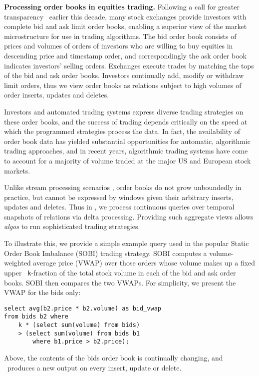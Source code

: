 \medskip


\textbf{Processing order books in equities trading.}  Following a call for
greater transparency~\cite{sec-orderbook:00} earlier this decade, many stock
exchanges provide investors with complete bid and ask limit order books,
enabling a superior view of the market microstructure for use in trading
algorithms. The bid order book consists of prices and volumes of orders of
investors who are willing to buy equities in descending price and timestamp
order, and correspondingly the ask order book indicates investors' selling
orders. Exchanges execute trades by matching the tops of the bid and ask order
books. Investors continually add, modify or withdraw limit orders, thus we view
order books as relations subject to high volumes of order inserts, updates and
deletes.

Investors and automated trading systems express diverse trading strategies on
these order books, and the success of trading depends critically on the speed at
which the programmed strategies process the data.  In fact, the availability of
order book data has yielded substantial opportunities for automatic, algorithmic
trading approaches, and in recent years, algorithmic trading systems have come
to account for a majority of volume traded at the major US and European stock
markets.

Unlike stream processing scenarios \cite{abadi-vldbj:03,motwani-cidr:03}, order
books do not grow unboundedly in practice, but cannot be expressed by windows
given their arbitrary inserts, updates and deletes. Thus in \compiler, we
process continuous queries over temporal snapshots of relations via delta
processing.  Providing such aggregate views allows {\em algos}\/ to run
sophisticated trading strategies. 

To illustrate this, we provide a simple example query used in the popular Static
Order Book Imbalance (SOBI) trading strategy. SOBI computes a volume-weighted
average price (VWAP) over those orders whose volume makes up a fixed upper {\tt
k}-fraction of the total stock volume in each of the bid and ask order
books. SOBI then compares the two VWAPs. For simplicity, we present the VWAP for
the bids only:

\begin{verbatim}
select avg(b2.price * b2.volume) as bid_vwap
from bids b2 where
    k * (select sum(volume) from bids)
    > (select sum(volume) from bids b1
        where b1.price > b2.price);
\end{verbatim} %
%
Above, the contents of the bids order book is continually changing, and
\compiler\ produces a new output on every insert, update or delete.


